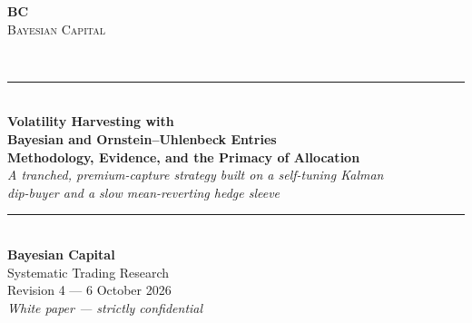 \documentclass[11pt]{article}
\begin{document}
\begin{titlepage}
\centering
\vspace*{3.2cm}
{\color{bcnavy}\fboxsep=22pt\colorbox{bcnavy}{\parbox{3.2cm}{\centering
  {\color{bcgold}\fontsize{34}{34}\selectfont\bfseries BC}\\[6pt]
  {\color{white}\footnotesize\textsc{Bayesian Capital}}}}}\\[2.4cm]
{\color{bcgold}\rule{0.62\textwidth}{0.8pt}}\\[0.5cm]
{\color{bcnavy}\LARGE\bfseries Volatility Harvesting with\\[2mm]
Bayesian and Ornstein--Uhlenbeck Entries}\\[0.35cm]
{\color{bcnavy}\large\bfseries Methodology, Evidence, and the Primacy of Allocation}\\[0.3cm]
{\color{bcgrey}\itshape\small A tranched, premium-capture strategy built on a self-tuning Kalman\\
dip-buyer and a slow mean-reverting hedge sleeve}\\[0.4cm]
{\color{bcgold}\rule{0.62\textwidth}{0.8pt}}\\[2.6cm]
{\color{bcnavy}\bfseries Bayesian Capital}\\[0.15cm]
{\color{bcgrey}Systematic Trading Research}\\[0.15cm]
{\color{bcgrey}Revision 4 --- 6 October 2026}\\[0.5cm]
{\color{bcgrey}\itshape\small White paper --- strictly confidential}
\end{titlepage}
\end{document}
